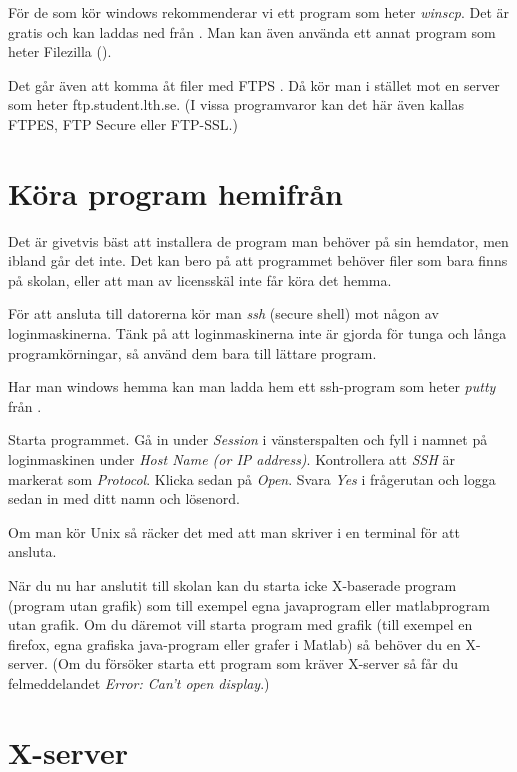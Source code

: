 \documentclass[a4paper,twocolumn]{book}
\begin{document}


För de som kör windows rekommenderar vi ett program som heter \emph{winscp}.
Det är gratis och kan laddas ned från . Man kan även
använda ett annat program som heter Filezilla
().

Det går även att komma åt filer med FTPS . Då kör man i stället mot en server
som heter ftp.student.lth.se. (I vissa programvaror kan det här även kallas
FTPES, FTP Secure eller FTP-SSL.)


\section{Köra program hemifrån}

Det är givetvis bäst att installera de program man behöver på sin hemdator,
men ibland går det inte. Det kan bero på att programmet behöver filer som bara
finns på skolan, eller att man av licensskäl inte får köra det hemma.

För att ansluta till datorerna kör man \emph{ssh} (secure shell) mot någon av
loginmaskinerna. Tänk på att loginmaskinerna inte är gjorda för tunga
och långa programkörningar, så använd dem bara till lättare program.

Har man windows hemma kan man ladda hem ett ssh-program som heter
\emph{putty} från .

Starta
programmet. Gå in under \emph{Session} i vänsterspalten och fyll i
namnet på loginmaskinen
under \emph{Host Name (or IP address)}. 
Kontrollera att \emph{SSH} är markerat som
\emph{Protocol}. Klicka
sedan på \emph{Open}. Svara \emph{Yes} i frågerutan och logga sedan in med
ditt namn och lösenord.

Om man kör Unix så räcker det med att man skriver 
 i en terminal för att ansluta.

När du nu har anslutit till skolan kan du starta icke X-baserade program
(program utan grafik) som till exempel egna javaprogram eller matlabprogram
utan grafik. 
Om du däremot vill starta program med grafik (till exempel en firefox, egna 
grafiska java-program eller grafer i Matlab) så behöver du en X-server. 
(Om du försöker starta ett program som kräver X-server så får du 
felmeddelandet \emph{Error: Can't open display}.)


\section{X-server}
\end{document}
